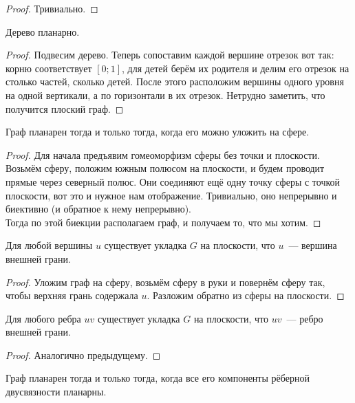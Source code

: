 \documentclass{article}
\begin{document}
    \begin{proof}
        Тривиально.
    \end{proof}
    \begin{lemma}
        Дерево планарно.
    \end{lemma}
    \begin{proof}
        Подвесим дерево. Теперь сопоставим каждой вершине отрезок вот так: корню соответствует $[0; 1]$, для детей берём их родителя и делим его отрезок на столько частей, сколько детей. После этого расположим вершины одного уровня на одной вертикали, а по горизонтали в их отрезок. Нетрудно заметить, что получится плоский граф.
    \end{proof}
    \begin{lemma}
        Граф планарен тогда и только тогда, когда его можно уложить на сфере.
    \end{lemma}
    \begin{proof}
        Для начала предъявим гомеоморфизм сферы без точки и плоскости. Возьмём сферу, положим южным полюсом на плоскости, и будем проводит прямые через северный полюс. Они соединяют ещё одну точку сферы с точкой плоскости, вот это и нужное нам отображение. Тривиально, оно непрерывно и биективно (и обратное к нему непрерывно).\\
        Тогда по этой биекции располагаем граф, и получаем то, что мы хотим.
    \end{proof}
    \begin{lemma}
        Для любой вершины $u$ существует укладка $G$ на плоскости, что $u$~--- вершина внешней грани.
    \end{lemma}
    \begin{proof}
        Уложим граф на сферу, возьмём сферу в руки и повернём сферу так, чтобы верхняя грань содержала $u$. Разложим обратно из сферы на плоскости.
    \end{proof}
    \begin{lemma}
        Для любого ребра $uv$ существует укладка $G$ на плоскости, что $uv$~--- ребро внешней грани.
    \end{lemma}
    \begin{proof}
        Аналогично предыдущему.
    \end{proof}
    \begin{lemma}
        \label{lmm:Граф планарен тогда и только тогда, когда все его компоненты рёберной двусвязности планарны.}
        Граф планарен тогда и только тогда, когда все его компоненты рёберной двусвязности планарны.
    \end{lemma}
\end{document}
